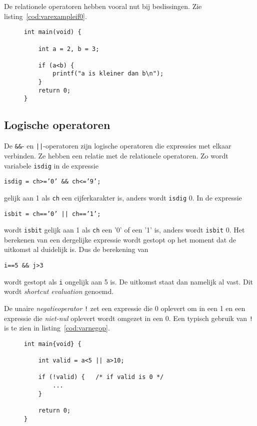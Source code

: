 De relationele operatoren hebben vooral nut bij beslissingen. Zie listing~\ref{cod:varexampleif0}.

\begin{figure}[H]
\begin{lstlisting}[caption=Voorbeeld van een beslissing.,label=cod:varexampleif0]
int main(void) {

    int a = 2, b = 3;

    if (a<b) {
        printf("a is kleiner dan b\n");
    }
    return 0;
}
\end{lstlisting}
\end{figure}

\subsection{Logische operatoren}
De \texttt{\&\&}- en \texttt{||}-operatoren zijn logische operatoren die expressies met elkaar verbinden. Ze hebben een relatie met de relationele operatoren. Zo wordt variabele \texttt{isdig} in de expressie

\hspace*{1em}\texttt{isdig = ch>='0' \&\& ch<='9';}

gelijk aan 1 als \texttt{ch} een cijferkarakter is, anders wordt \texttt{isdig} 0. In de expressie

\hspace*{1em}\texttt{isbit = ch=='0' || ch=='1';}

wordt \texttt{isbit} gelijk aan 1 als \texttt{ch} een '0' of een '1' is, anders wordt \texttt{isbit} 0. Het berekenen van een dergelijke expressie wordt gestopt op het moment dat de uitkomst al duidelijk is. Dus de berekening van

\hspace*{1em}\texttt{i==5 \&\& j>3}

wordt gestopt als \texttt{i} ongelijk aan 5 is. De uitkomst staat dan namelijk al vast. Dit wordt \textsl{shortcut evaluation} genoemd.

De unaire \textsl{negatieoperator} \texttt{!} zet een expressie die 0 oplevert om in een 1 en een expressie die \textsl{niet-nul} oplevert wordt omgezet in een 0. Een typisch gebruik van \texttt{!} is te zien in listing~\ref{cod:varnegop}.

\begin{figure}[!ht]
\begin{lstlisting}[caption=Voorbeeld van de negatieoperator.,label=cod:varnegop]
int main{void} {

    int valid = a<5 || a>10;

    if (!valid) {   /* if valid is 0 */
        ...
    }

    return 0;
}
\end{lstlisting}
\end{figure}

